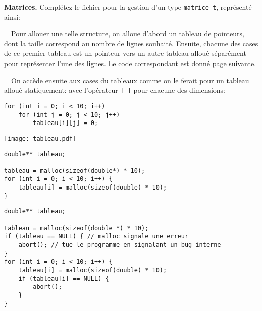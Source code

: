 \documentclass[10pt]{article}\usepackage[enonce]{exemptty}
\begin{document}
\begin{Exercice} \textbf{Matrices.}  Complétez le fichier
   pour la gestion d'un type \texttt{matrice\_t},
  représenté ainsi:
  
  \smallskip\noindent
  \begin{minipage}{.5\linewidth}%

    ~~Pour allouer une telle structure, on alloue d'abord un tableau de
    pointeurs, dont la taille correspond au nombre de lignes
    souhaité. Ensuite, chacune des cases de ce premier tableau est un
    pointeur vers un autre tableau alloué séparément pour représenter
    l'une des lignes. Le code correspondant est donné page suivante.

    \smallskip
    ~~On accède ensuite aux cases du tableaux comme on le ferait pour un
    tableau alloué statiquement: avec l'opérateur \verb~[ ]~ pour
    chacune des dimensions:

\begin{Verbatim}[label=Initialisation des éléments,numbers=right]    
for (int i = 0; i < 10; i++)
    for (int j = 0; j < 10; j++)
        tableau[i][j] = 0;
\end{Verbatim}


\end{minipage}\hfill\begin{minipage}{.48\linewidth}
  \texttt{[image: tableau.pdf]}
\end{minipage}
  
\begin{Verbatim}[label=Allocation d'un tableau de 10*10 doubles]
double** tableau;

tableau = malloc(sizeof(double*) * 10);
for (int i = 0; i < 10; i++) {
    tableau[i] = malloc(sizeof(double) * 10);
}
\end{Verbatim}

\begin{Verbatim}[label=Idem avec gestion des erreurs]
double** tableau;

tableau = malloc(sizeof(double *) * 10);
if (tableau == NULL) { // malloc signale une erreur
    abort(); // tue le programme en signalant un bug interne
}
for (int i = 0; i < 10; i++) {
    tableau[i] = malloc(sizeof(double) * 10);
    if (tableau[i] == NULL) {
        abort();
    }
}
\end{Verbatim}



\end{Exercice}
\end{document}
